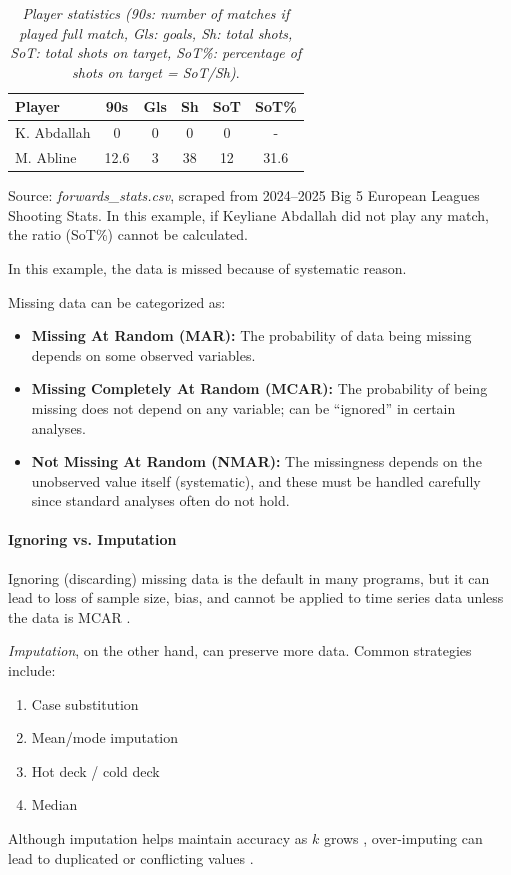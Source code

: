 \documentclass[10pt,twocolumn]{article}
\begin{document}
\begin{table}[h]
\centering
\caption{\textit{Player statistics (90s: number of matches if played full match, Gls: goals, Sh: total shots, SoT: total shots on target, SoT\%: percentage of shots on target = SoT/Sh)}.}
\label{tab:player-stats}
\begin{tabular}{|l|c|c|c|c|c|}
\hline
\textbf{Player} & \textbf{90s} & \textbf{Gls} & \textbf{Sh} & \textbf{SoT} & \textbf{SoT\%} \\ \hline
K. Abdallah & 0   & 0 & 0  & 0  & -    \\ \hline
M. Abline     & 12.6 & 3 & 38 & 12 & 31.6 \\ \hline
\end{tabular}

\vspace{0.5em}
Source: \textit{forwards\_stats.csv}, scraped from 2024--2025 Big 5 European Leagues Shooting Stats. In this example, if Keyliane Abdallah did not play any match, the ratio (SoT\%) cannot be calculated.
\end{table}

In this example, the data is missed because of systematic reason.

Missing data can be categorized as:
\begin{itemize}
    \item \textbf{Missing At Random (MAR):} The probability of data being missing depends on some observed variables.
    \item \textbf{Missing Completely At Random (MCAR):} The probability of being missing does not depend on any variable; can be ``ignored'' in certain analyses.
    \item \textbf{Not Missing At Random (NMAR):} The missingness depends on the unobserved value itself (systematic), and these must be handled carefully since standard analyses often do not hold.
\end{itemize}

\paragraph{Ignoring vs. Imputation}
Ignoring (discarding) missing data is the default in many programs, but it can lead to loss of sample size, bias, and cannot be applied to time series data unless the data is MCAR \cite{guan2011,batista2003}.

\emph{Imputation}, on the other hand, can preserve more data. Common strategies \cite{acuna2004,zahin2018} include:
\begin{enumerate}
    \item Case substitution
    \item Mean/mode imputation
    \item Hot deck / cold deck
    \item Median
\end{enumerate}
Although imputation helps maintain accuracy as $k$ grows \cite{murti2019}, over-imputing can lead to duplicated or conflicting values \cite{batista2003}.
\end{document}
